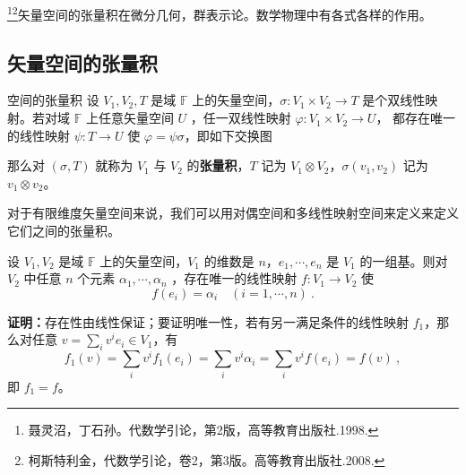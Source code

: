

\footnote{聂灵沼，丁石孙。代数学引论，第2版，高等教育出版社.1998.}\footnote{柯斯特利金，代数学引论，卷2，第3版。高等教育出版社.2008.}矢量空间的张量积在微分几何，群表示论。数学物理中有各式各样的作用。

\subsection{矢量空间的张量积}
\begin{definition}{空间的张量积}\label{def_TPofSp_1}
设 $V_1, V_2,T$ 是域 $\mathbb F$ 上的矢量空间，$\sigma: V_1 \times V_2 \rightarrow T$ 是个双线性映射。若对域 $\mathbb F$ 上任意矢量空间 $U$ ，任一双线性映射 $\varphi:V_1\times V_2\rightarrow U$， 都存在唯一的线性映射 $\psi:T\rightarrow U$ 使 $\varphi=\psi\sigma$，即如下交换图
\begin{equation}
\end{equation}

那么对 $(\sigma, T)$ 就称为 $V_1$ 与 $V_2$ 的\textbf{张量积}，$T$ 记为 $V_1 \otimes V_2$，$\sigma(v_1, v_2)$ 记为 $v_1 \otimes v_2$。
\end{definition}

对于有限维度矢量空间来说，我们可以用对偶空间和多线性映射空间来定义来定义它们之间的张量积。

\begin{lemma}{}\label{lem_TPofSp_2}
设 $V_1,V_2$ 是域 $\mathbb F$ 上的矢量空间，$V_1$ 的维数是 $n$，$e_1,\cdots,e_n$ 是 $V_1$ 的一组基。则对 $V_2$ 中任意 $n$ 个元素 $\alpha_1,\cdots,\alpha_n$ ，存在唯一的线性映射 $f:V_1\rightarrow V_2$ 使
\begin{equation}
f(e_i)=\alpha_i\quad (i=1,\cdots,n)~.
\end{equation}
\end{lemma}
\textbf{证明：}存在性由线性保证；要证明唯一性，若有另一满足条件的线性映射 $f_1$，那么对任意 $v=\sum\limits_{i}v^ie_i\in V_1$，有
\begin{equation}
f_1(v)=\sum_{i}v^if_1(e_i)=\sum_{i}v^i\alpha_i=\sum_{i}v^if(e_i)=f(v)~,
\end{equation}
即 $f_1=f$。

